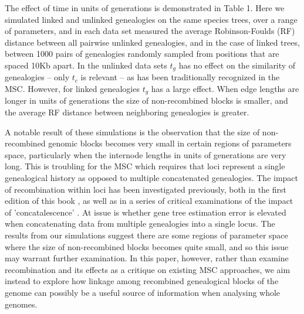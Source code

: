 \documentclass[11pt]{article}
\begin{document}
The effect of time in units of generations is demonstrated in Table 1. Here we simulated linked and unlinked genealogies on the same species trees, over a range of parameters, and in each data set measured the average Robinson-Foulds (RF) distance between all pairwise unlinked genealogies, and in the case of linked trees, between 1000 pairs of genealogies randomly sampled from positions that are spaced 10Kb apart. In the unlinked data sets $t_g$ has no effect on the similarity of genealogies -- only $t_c$ is relevant -- as has been traditionally recognized in the MSC. However, for linked genealogies $t_g$ has a large effect. When edge lengths are longer in units of generations the size of non-recombined blocks is smaller, and the average RF distance between neighboring genealogies is greater. 

A notable result of these simulations is the observation that the size of non-recombined genomic blocks becomes very small in certain regions of parameters space, particularly when the internode lengths in units of generations are very long. This is troubling for the MSC which requires that loci represent a single genealogical history as opposed to multiple concatenated genealogies. The impact of recombination within loci has been investigated previously, both in the first edition of this book \citep{castillo-ramirez_bayesian_2010}, as well as in a series of critical examinations of the impact of 'concatalescence' \citep{springer_gene_2016}. At issue is whether gene tree estimation error is elevated when concatenating data from multiple genealogies into a single locus. The results from our simulations suggest there are some regions of parameter space where the size of non-recombined blocks becomes quite small, and so this issue may warrant further examination. In this paper, however, rather than examine recombination and its effects as a critique on existing MSC approaches, we aim instead to explore how linkage among recombined genealogical blocks of the genome can possibly be a useful source of information when analysing whole genomes. 
\end{document}

